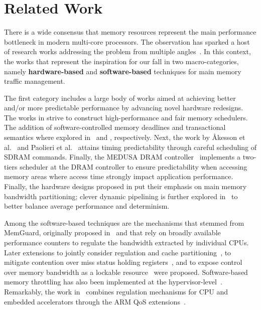 \section{Related Work}
There is a wide consensus that memory resources represent the main
performance bottleneck in modern multi-core processors. The
observation has sparked a host of research works addressing the
problem from multiple angles~\cite{temp_reg_survey}. In this context,
the works that represent the inspiration for our \schim fall in two
macro-categories, namely \textbf{hardware-based} and
\textbf{software-based} techniques for main memory traffic management.

The first category includes a large body of works aimed at achieving
better and/or more predictable performance by advancing novel hardware
redesigns. The works in \cite{mutlu2007stall, mutlu2008parallelism,
  nesbit2006fair} strive to construct high-performance and fair memory
schedulers. The addition of software-controlled memory deadlines and
transactional semantics where explored in~\cite{usui2016dash} and
\cite{ferri2011soc}, respectively. Next, the work by Åkesson et
al.~\cite{akesson2007predator, akesson2010predictable} and Paolieri et
al.~\cite{paolieri2009analyzable} attains timing predictability
through careful scheduling of SDRAM commands. Finally, the MEDUSA DRAM
controller~\cite{valsan2015medusa, detmem2018} implements a two-tiers
scheduler at the DRAM controller to ensure predictability when
accessing memory areas where access time strongly impact application
performance. Finally, the hardware designs proposed in
\cite{zhou2016mitts, rafique2007effective, Farshchi2020BRUBR} put
their emphasis on main memory bandwidth partitioning; clever dynamic
pipelining is further explored in~\cite{drambulism2020rtas} to better
balance average performance and determinism.

Among the software-based techniques are the mechanisms that stemmed
from MemGuard, originally proposed in~\cite{memguard2013} and that
rely on broadly available performance counters to regulate the
bandwidth extracted by individual CPUs. Later extensions to jointly
consider regulation and cache partitioning~\cite{holistic}, to
mitigate contention over miss status holding registers~\cite{taming},
and to expose control over memory bandwidth as a lockable
resource~\cite{bwlock} were proposed. Software-based memory throttling
has also been implemented at the hypervisor-level~\cite{xvisor2018,
  ewarp2020rtss}. Remarkably, the work in~\cite{ewarp2020rtss}
combines regulation mechanisms for CPU and embedded accelerators
through the ARM QoS extensions~\cite{qos-400}.

